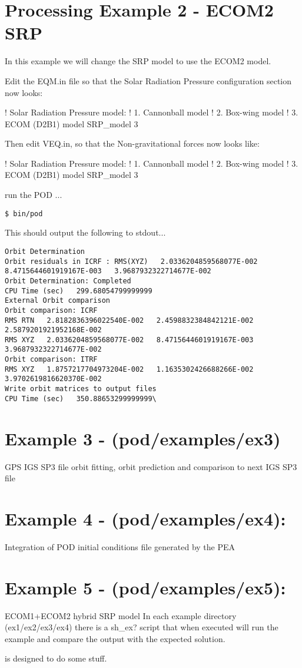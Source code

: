 \section{Processing Example 2 - ECOM2 SRP}
In this example we will change the SRP model to use the ECOM2 model.

Edit the EQM.in file so that the Solar Radiation Pressure configuration section now looks:

! Solar Radiation Pressure model: ! 1. Cannonball model ! 2. Box-wing model ! 3. ECOM (D2B1) model SRP\_model 3

Then edit VEQ.in, so that the Non-gravitational forces now looks like:


! Solar Radiation Pressure model: ! 1. Cannonball model ! 2. Box-wing model ! 3. ECOM (D2B1) model SRP\_model 3

run the POD ...

\begin{verbatim}
$ bin/pod
\end{verbatim}
This should output the following to stdout...
\begin{verbatim}
Orbit Determination
Orbit residuals in ICRF : RMS(XYZ)   2.0336204859568077E-002   8.4715644601919167E-003   3.9687932322714677E-002
Orbit Determination: Completed
CPU Time (sec)   299.68054799999999
External Orbit comparison
Orbit comparison: ICRF
RMS RTN   2.8182836396022540E-002   2.4598832384842121E-002   2.5879201921952168E-002
RMS XYZ   2.0336204859568077E-002   8.4715644601919167E-003   3.9687932322714677E-002
Orbit comparison: ITRF
RMS XYZ   1.8757217704973204E-002   1.1635302426688266E-002   3.9702619816620370E-002
Write orbit matrices to output files
CPU Time (sec)   350.88653299999999\
\end{verbatim}

\section{Example 3 - (pod/examples/ex3)}
GPS IGS SP3 file orbit fitting, orbit prediction and comparison to next IGS SP3 file

\section{Example 4 - (pod/examples/ex4):}
Integration of POD initial conditions file generated by the PEA

\section{Example 5 - (pod/examples/ex5):}
ECOM1+ECOM2 hybrid SRP model
In each example directory (ex1/ex2/ex3/ex4) there is a sh\_ex? script that when executed will run the example and compare the output with the expected solution.

 is designed to do some stuff.